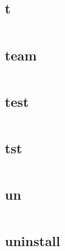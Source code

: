 \begin{lstlisting}[language=bash]

\end{lstlisting}


\subsection{t}


\begin{lstlisting}[language=bash]

\end{lstlisting}

\subsection{team}



\begin{lstlisting}[language=bash]

\end{lstlisting}

\subsection{test}




\begin{lstlisting}[language=bash]

\end{lstlisting}

\subsection{tst}






\begin{lstlisting}[language=bash]

\end{lstlisting}

\subsection{un}

\begin{lstlisting}[language=bash]

\end{lstlisting}

\subsection{uninstall}


